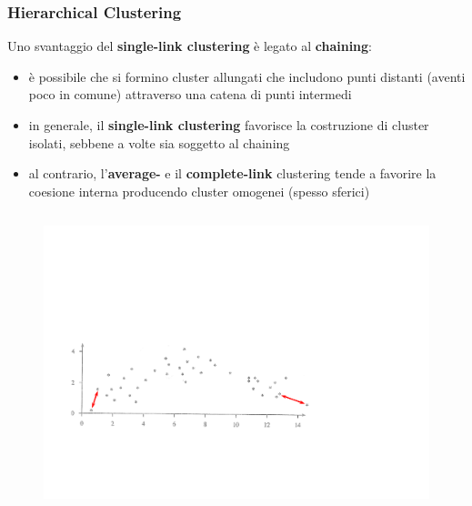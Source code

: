 \begin{frame}

	\frametitle{{\color{GradientDescentDiagramGreen}Hierarchical Clustering}}


		Uno svantaggio del \textbf{single-link clustering} è legato al \textbf{chaining}:
		\begin{itemize}
			\item è possibile che si formino cluster allungati che includono punti distanti (aventi poco in comune) attraverso una catena di punti intermedi
			\item in generale, il \textbf{single-link clustering} favorisce la costruzione di cluster isolati, sebbene a volte sia soggetto al chaining
			\item al contrario, l'\textbf{average-} e il \textbf{complete-link} clustering tende a favorire la coesione interna producendo cluster omogenei (spesso sferici)
		\end{itemize}

		\begin{columns}

			\begin{figure}[!htbp]
				\centering
				\includegraphics[angle=0,width=1\linewidth]{images/unsupervised/hierarchical/hierarchical_single_link_drawback_1.pdf}
			\end{figure}


\end{columns}
\end{frame}
